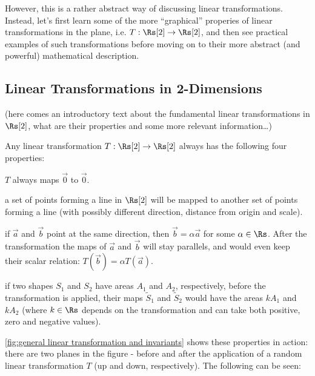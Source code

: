 However, this is a rather abstract way of discussing linear transformations. Instead, let's first learn some of the more \enquote{graphical} properies of linear transformations in the plane, i.e. $T:\Rs[2]\to\Rs[2]$, and then see practical examples of such transformations before moving on to their more abstract (and powerful) mathematical description.

\subsection{Linear Transformations in 2-Dimensions}
(here comes an introductory text about the fundamental linear transformations in $\Rs[2]$, what are their properties and some more relevant information\dots)

Any linear transformation $T:\Rs[2]\to\Rs[2]$ always has the following four properties:
\begin{descitemize}
	\item[The origin is kept untouched] $T$ always maps $\vec{0}$ to $\vec{0}$.
	\item[Lines remain lines] a set of points forming a line in $\Rs[2]$ will be mapped to another set of points forming a line (with possibly different direction, distance from origin and scale).
	\item[Parallel directions remain parallel] if $\vec{a}$ and $\vec{b}$ point at the same direction, then $\vec{b}=\alpha\vec{a}$ for some $\alpha\in\Rs$. After the transformation the maps of $\vec{a}$ and $\vec{b}$ will stay parallels, and would even keep their scalar relation: $T(\vec{b})=\alpha T(\vec{a})$.
	\item[All areas are scaled by the same factor] if two shapes $S_{1}$ and $S_{2}$ have areas $A_{1}$ and $A_{2}$, respectively, before the transformation is applied, their maps $\tilde{S}_{1}$ and $\tilde{S}_{2}$ would have the areas $kA_{1}$ and $kA_{2}$ (where $k\in\Rs$ depends on the transformation and can take both positive, zero and negative values).
\end{descitemize}
\autoref{fig:general linear transformation and invariants} shows these properties in action: there are two planes in the figure - before and after the application of a random linear transformation $T$ (up and down, respectively). The following can be seen:
